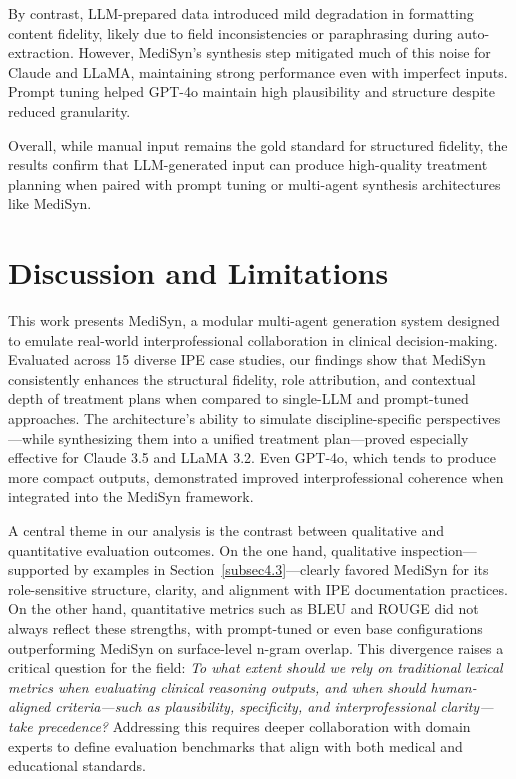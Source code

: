 \documentclass[pdflatex,sn-mathphys-num]{sn-jnl}%
\theoremstyle{thmstyleone}%
\theoremstyle{thmstyletwo}%
\theoremstyle{thmstylethree}%
\begin{document}
By contrast, LLM-prepared data introduced mild degradation in formatting content fidelity, likely due to field inconsistencies or paraphrasing during auto-extraction. However, MediSyn’s synthesis step mitigated much of this noise for Claude and LLaMA, maintaining strong performance even with imperfect inputs. Prompt tuning helped GPT-4o maintain high plausibility and structure despite reduced granularity.

Overall, while manual input remains the gold standard for structured fidelity, the results confirm that LLM-generated input can produce high-quality treatment planning when paired with prompt tuning or multi-agent synthesis architectures like MediSyn.





\section{Discussion and Limitations}\label{sec5}

This work presents MediSyn, a modular multi-agent generation system designed to emulate real-world interprofessional collaboration in clinical decision-making. Evaluated across 15 diverse IPE case studies, our findings show that MediSyn consistently enhances the structural fidelity, role attribution, and contextual depth of treatment plans when compared to single-LLM and prompt-tuned approaches. The architecture's ability to simulate discipline-specific perspectives—while synthesizing them into a unified treatment plan—proved especially effective for Claude 3.5 and LLaMA 3.2. Even GPT-4o, which tends to produce more compact outputs, demonstrated improved interprofessional coherence when integrated into the MediSyn framework.

A central theme in our analysis is the contrast between qualitative and quantitative evaluation outcomes. On the one hand, qualitative inspection—supported by examples in Section~\ref{subsec4.3}—clearly favored MediSyn for its role-sensitive structure, clarity, and alignment with IPE documentation practices. On the other hand, quantitative metrics such as BLEU and ROUGE did not always reflect these strengths, with prompt-tuned or even base configurations outperforming MediSyn on surface-level n-gram overlap. This divergence raises a critical question for the field: \textit{To what extent should we rely on traditional lexical metrics when evaluating clinical reasoning outputs, and when should human-aligned criteria—such as plausibility, specificity, and interprofessional clarity—take precedence?} Addressing this requires deeper collaboration with domain experts to define evaluation benchmarks that align with both medical and educational standards.
\end{document}
